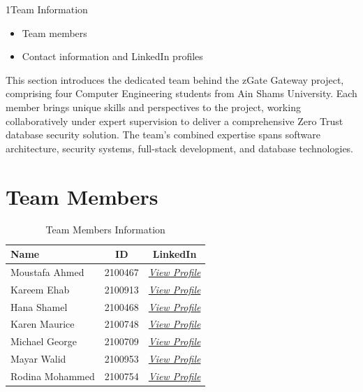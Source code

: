 
\begin{sectionintro}{1}{Team Information}{
  \begin{itemize}[leftmargin=1.5em]
    \item Team members
    \item Contact information and LinkedIn profiles
  \end{itemize}
}
This section introduces the dedicated team behind the zGate Gateway project, comprising four Computer Engineering students from Ain Shams University. Each member brings unique skills and perspectives to the project, working collaboratively under expert supervision to deliver a comprehensive Zero Trust database security solution. The team's combined expertise spans software architecture, security systems, full-stack development, and database technologies.
\end{sectionintro}

\section*{Team Members}

\begin{table}[h]
\centering
\renewcommand{\arraystretch}{1.8}
\begin{tabular}{lcc}
\toprule

\textbf{\large Name} & \textbf{\large ID} & \textbf{\large LinkedIn} \\
\midrule
Moustafa Ahmed & 2100467 & \href{https://www.linkedin.com/in/moustafa-hashem-975099261/}{\textcolor{darkNavy}{\textit{View Profile}}} \\

Kareem Ehab & 2100913 & \href{https://www.linkedin.com/in/kareem913/}{\textcolor{darkNavy}{\textit{View Profile}}} \\
Hana Shamel & 2100468 & \href{https://www.linkedin.com/in/hana-shamel-b37a76261/}{\textcolor{darkNavy}{\textit{View Profile}}} \\

Karen Maurice & 2100748 & \href{https://www.linkedin.com/in/karen-maurice-william-3174a6275/}{\textcolor{darkNavy}{\textit{View Profile}}} \\
Michael George & 2100709 & \href{https://www.linkedin.com/in/michaelgeorge55/}{\textcolor{darkNavy}{\textit{View Profile}}} \\

Mayar Walid & 2100953 & \href{https://www.linkedin.com/in/mayarwalid/}{\textcolor{darkNavy}{\textit{View Profile}}} \\
Rodina Mohammed & 2100754 & \href{https://www.linkedin.com/in/rodina-m-0b1602322/}{\textcolor{darkNavy}{\textit{View Profile}}} \\
\bottomrule
\end{tabular}
\caption{Team Members Information}
\label{tab:team_members}
\end{table}

